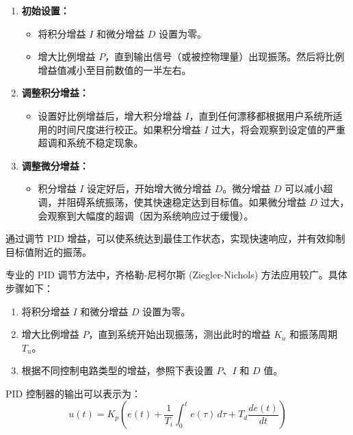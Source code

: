 \documentclass[dvipsnames, svgnames,a4paper,11pt]{article}
\begin{document}
            \begin{enumerate}
                \item \textbf{初始设置：}
                \begin{itemize}
                    \item 将积分增益 $I$ 和微分增益 $D$ 设置为零。
                    \item 增大比例增益 $P$，直到输出信号（或被控物理量）出现振荡。然后将比例增益值减小至目前数值的一半左右。
                \end{itemize}
                
                \item \textbf{调整积分增益：}
                \begin{itemize}
                    \item 设置好比例增益后，增大积分增益 $I$，直到任何漂移都根据用户系统所适用的时间尺度进行校正。如果积分增益 $I$ 过大，将会观察到设定值的严重超调和系统不稳定现象。
                \end{itemize}
                
                \item \textbf{调整微分增益：}
                \begin{itemize}
                    \item 积分增益 $I$ 设定好后，开始增大微分增益 $D$。微分增益 $D$ 可以减小超调，并阻碍系统振荡，使其快速稳定达到目标值。如果微分增益 $D$ 过大，会观察到大幅度的超调（因为系统响应过于缓慢）。
                \end{itemize}
            \end{enumerate}
        
            通过调节 PID 增益，可以使系统达到最佳工作状态，实现快速响应，并有效抑制目标值附近的振荡。
        
            专业的 PID 调节方法中，齐格勒-尼柯尔斯 (Ziegler-Nichols) 方法应用较广。具体步骤如下：
        
            \begin{enumerate}
                \item 将积分增益 $I$ 和微分增益 $D$ 设置为零。
                \item 增大比例增益 $P$，直到系统开始出现振荡，测出此时的增益 $K_u$ 和振荡周期 $T_u$。
                \item 根据不同控制电路类型的增益，参照下表设置 $P$、$I$ 和 $D$ 值。
            \end{enumerate}
        
            PID 控制器的输出可以表示为：
            \[
            u(t) = K_p \left( e(t) + \frac{1}{T_i} \int_0^t e(\tau) \, d\tau + T_d \frac{d e(t)}{d t} \right)
            \]
        
\end{document}
